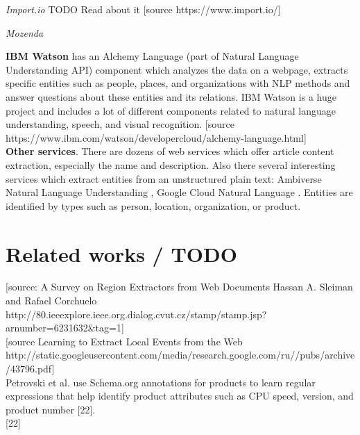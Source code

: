\noindent\textit{Import.io} TODO Read about it
\cite{Importio}[source https://www.import.io/]

\noindent \textit{Mozenda} \cite{Mozenda}

\noindent \textbf{IBM Watson} has an Alchemy Language (part of Natural Language Understanding API) component which analyzes the data on a webpage, extracts specific entities such as people, places, and organizations with NLP methods and answer questions about these entities and its relations. IBM Watson is a huge project and includes a lot of different components related to natural language understanding, speech, and visual recognition.     
\cite{IBMAlchemy} [source https://www.ibm.com/watson/developercloud/alchemy-language.html] \\

\noindent\textbf{Other services}. There are dozens of web services which offer article content extraction, especially the name and description. Also there several interesting services which extract entities from an unstructured plain text: Ambiverse Natural Language Understanding \cite{Ambiverse}, Google Cloud Natural Language \cite{GoogNLP}. Entities are identified by types such as person, location, organization, or product.\\


\section{Related works / TODO}

\cite{RegExtrSurvey} [source: A Survey on Region Extractors from Web Documents Hassan A. Sleiman and Rafael Corchuelo http://80.ieeexplore.ieee.org.dialog.cvut.cz/stamp/stamp.jsp?arnumber=6231632&tag=1] \\

\cite{GoogEvent} [source Learning to Extract Local Events from the Web http://static.googleusercontent.com/media/research.google.com/ru//pubs/archive/43796.pdf] \\

Petrovski et al. use Schema.org annotations
for products to learn regular expressions that help identify
product attributes such as CPU speed, version, and product
number [22]. \\
\cite{Petrovski} [22]\\

